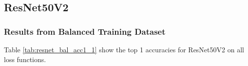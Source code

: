 


\subsection{ResNet50V2}

\subsubsection{Results from Balanced Training Dataset}

Table \ref{tab:resnet_bal_acc1_1} show the top 1 accuracies for ResNet50V2 on all loss functions.

